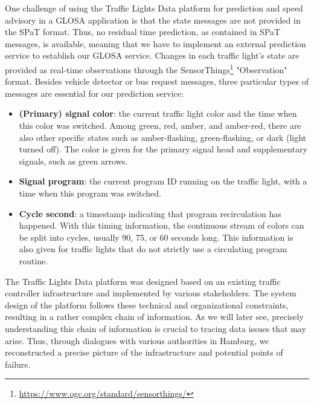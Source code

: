 One challenge of using the Traffic Lights Data platform for prediction and speed advisory in a GLOSA application is that the state messages are not provided in the SPaT format. Thus, no residual time prediction, as contained in SPaT messages, is available, meaning that we have to implement an external prediction service to establish our GLOSA service. Changes in each traffic light's state are provided as real-time observations through the SensorThings\footnote{\url{https://www.ogc.org/standard/sensorthings/}} "Observation" format. Besides vehicle detector or bus request messages, three particular types of messages are essential for our prediction service:

\begin{itemize}
    \item \textbf{(Primary) signal color}: the current traffic light color and the time when this color was switched. Among green, red, amber, and amber-red, there are also other specific states such as amber-flashing, green-flashing, or dark (light turned off). The color is given for the primary signal head and supplementary signals, such as green arrows.
    \item \textbf{Signal program}: the current program ID running on the traffic light, with a time when this program was switched.
    \item \textbf{Cycle second}: a timestamp indicating that program recirculation has happened. With this timing information, the continuous stream of colors can be split into cycles, usually 90, 75, or 60 seconds long. This information is also given for traffic lights that do not strictly use a circulating program routine.
\end{itemize}

The Traffic Lights Data platform was designed based on an existing traffic controller infrastructure and implemented by various stakeholders. The system design of the platform follows these technical and organizational constraints, resulting in a rather complex chain of information. As we will later see, precisely understanding this chain of information is crucial to tracing data issues that may arise. Thus, through dialogues with various authorities in Hamburg, we reconstructed a precise picture of the infrastructure and potential points of failure.

